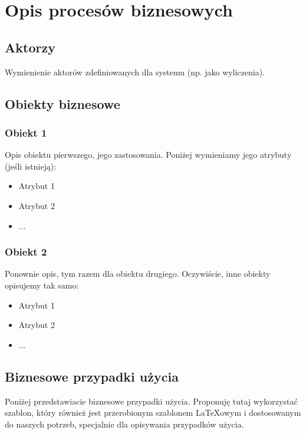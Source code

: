 \chapter{Opis procesów biznesowych}
\label{Chapter2}

\section{Aktorzy}
\label{Chapter21}

Wymienienie aktorów zdefiniowanych dla systemu (np. jako wyliczenia).

\section{Obiekty biznesowe}
\label{Chapter22}

\subsection{Obiekt 1}

Opis obiektu pierwszego, jego zastosowania. Poniżej wymieniamy jego atrybuty (jeśli istnieją):

\begin{itemize}
\item Atrybut 1
\item Atrybut 2
\item ...
\end{itemize}

\subsection{Obiekt 2}

Ponownie opis, tym razem dla obiektu drugiego. Oczywiście, inne obiekty opisujemy tak samo:

\begin{itemize}
\item Atrybut 1
\item Atrybut 2
\item ...
\end{itemize}

\pagebreak
\section{Biznesowe przypadki użycia}
\label{Chapter23}

Poniżej przedstawiacie biznesowe przypadki użycia. Proponuję tutaj wykorzystać szablon, który również jest przerobionym szablonem LaTeXowym i dostosowanym do naszych potrzeb, specjalnie dla opisywania przypadków użycia.

